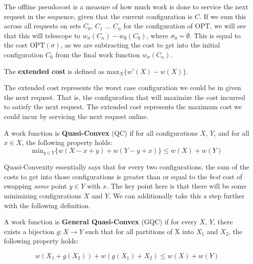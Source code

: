 The offline pseudocost is a measure of how much work is done to service the next request in the sequence, given that the current configuration is $C$. If we sum this across all requests on sets $C_0$, $C_1$ ... $C_n$ for the configuration of $\mathrm{OPT}$, we will see that this will telescope to $w_{\sigma}(C_n) - w_{\emptyset}(C_0)$, where $\sigma_0 = \emptyset$. This is equal to the cost $\mathrm{OPT}(\sigma)$, as we are subtracting the cost to get into the initial configuration $C_0$ from the final work function $w_\sigma(C_n)$.

\begin{definition}
    The \textbf{extended cost} is defined as $\mathrm{max}_X \{ w'(X) - w(X)\}$.
\end{definition}

The extended cost represents the worst case configuration we could be in given the next request. That is, the configuration that will maximize the cost incurred to satisfy the next request. The extended cost represents the maximum cost we could incur by servicing the next request online.

\begin{definition}
    A work function is \textbf{Quasi-Convex} (QC) if for all configurations $X$, $Y$, and for all $x \in X$, the following property holds:
    \begin{equation*}
        \mathrm{min}_{y \in Y} \{ w(X - x + y) + w(Y - y + x)\} \leq w(X) + w(Y)
    \end{equation*}
\end{definition}

Quasi-Convexity essentially says that for every two configurations, the sum of the costs to get into those configurations is greater than or equal to the \textit{best} cost of swapping \textit{some} point $y\in Y$ with $x$. The key point here is that there will be some minimizing configurations $X$ and $Y$. We can additionally take this a step further with the following definition.

\begin{definition}
A work function is \textbf{General Quasi-Convex} (GQC) if for every $X$, $Y$, there exists a bijection $g: X \rightarrow Y$ such that for all partitions of X into $X_1$ and $X_2$, the following property holds:

\begin{equation*}
    w(X_1 + g(X_2)) + w(g(X_1) + X_2) \leq w(X) + w(Y)
\end{equation*}
\end{definition}

